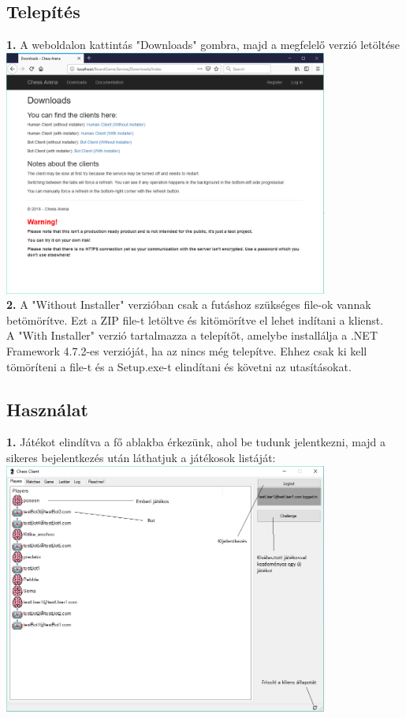 \documentclass[twoside, a4paper, 12pt]{article}
\begin{document}
\subsection{Telepítés}
\noindent \textbf{1.} A weboldalon kattintás "Downloads" gombra, majd a megfelelő verzió letöltése \\
\includegraphics[width=0.8\textwidth]{img/service_downloads.png} \\
\noindent \textbf{2.} A "Without Installer" verzióban csak a futáshoz szükséges file-ok vannak betömörítve. Ezt a ZIP file-t letöltve és kitömörítve el lehet indítani a klienst. \\
A "With Installer" verzió tartalmazza a telepítőt, amelybe installálja a .NET Framework 4.7.2-es verzióját, ha az nincs még telepítve. Ehhez csak ki kell tömöríteni a file-t és a Setup.exe-t elindítani és követni az utasításokat.
\subsection{Használat}
\noindent \textbf{1.} Játékot elindítva a fő ablakba érkezünk, ahol be tudunk jelentkezni, majd a sikeres bejelentkezés után láthatjuk a játékosok listáját: \\
\includegraphics[width=0.8\textwidth]{img/chessClient_1.png} \\
\end{document}
